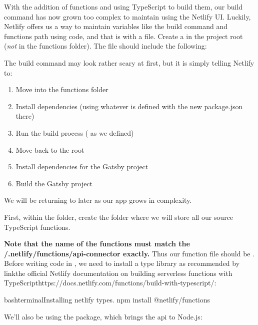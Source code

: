 \documentclass[paper=6in:9in,pagesize=pdftex,headinclude=on,footinclude=on,12pt,twoside]{scrbook}
\begin{document}
With the addition of functions and using TypeScript to build them, our build command has now grown too complex to maintain using the Netlify UI. Luckily, Netlify offers us a way to maintain variables like the build command and functions path using code, and that is with a  file. Create a  in the project root (\textit{not} in the functions folder). The  file should include the following:


The build command may look rather scary at first, but it is simply telling Netlify to:

\begin{enumerate}
  \item Move into the functions folder
  \item Install dependencies (using whatever is defined with the new package.json there)
  \item Run the build process ( as we defined)
  \item Move back to the root
  \item Install dependencies for the Gatsby project
  \item Build the Gatsby project
\end{enumerate}

We will be returning to  later as our app grows in complexity.


First, within the  folder, create the  folder where we will store all our source TypeScript functions.

\textbf{Note that the name of the functions must match the /.netlify/functions/api-connector exactly.} Thus our function file should be . Before writing code in , we need to install a type library as recommended by \;link{the official Netlify documentation on building serverless functions with TypeScript}{https://docs.netlify.com/functions/build-with-typescript/}:

\begin{codeInput}{bash}{terminal}{Installing netlify types.}
npm install @netlify/functions
\end{codeInput}

We'll also be using the  package, which brings the  api to Node.js:
\end{document}
